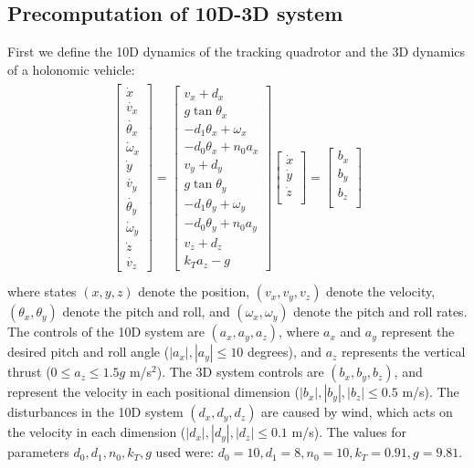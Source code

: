 \subsection{Precomputation of 10D-3D system}
First we define the 10D dynamics of the tracking quadrotor and the 3D dynamics of a holonomic vehicle:
\begin{equation}
\label{eq:Quad10D_dyn}
\begin{aligned}
\begin{array}{c}
\left[
\begin{array}{c}
\dot{x}\\
\dot{v_x}\\
\dot{\theta_x}\\
\dot\omega_x\\
\dot{y}\\
\dot{v_y}\\
\dot{\theta_y}\\
\dot\omega_y\\
\dot{z}\\
\dot{v_z}
\end{array}
\right]
=
\left[
\begin{array}{c}
v_x + d_x\\
g \tan \theta_x\\
-d_1 \theta_x + \omega_x\\
-d_0 \theta_x + n_0 a_x\\
v_y + d_y\\
g \tan \theta_y\\
-d_1 \theta_y + \omega_y\\
-d_0 \theta_y + n_0 a_y\\
v_z + d_z\\
k_T a_z - g
\end{array}
\right]
\left[
\begin{array}{c}
\dot{x}\\
\dot{y}\\
\dot{z}\\
\end{array}
\right] 
=
\left[
\begin{array}{c}
b_x\\
b_y\\
b_z \\
\end{array}
\right]
\end{array}\\
\end{aligned}
\end{equation}
where states $(x, y, z)$ denote the position, $(v_x, v_y, v_z)$ denote the velocity, $(\theta_x, \theta_y)$ denote the pitch and roll, and $(\omega_x, \omega_y)$ denote the pitch and roll rates. The controls of the 10D system are $(a_x, a_y, a_z)$, where $a_x$ and $a_y$ represent the desired pitch and roll angle ($|a_x|,|a_y|\leq10$ degrees), and $a_z$ represents the vertical thrust ($0\leq a_z\leq 1.5g$ m/s$^{2}$). The 3D system controls are $(b_x, b_y, b_z)$, and represent the velocity in each positional dimension ($|b_x|,|b_y|,|b_z|\leq0.5$ m/s). The disturbances in the 10D system $(d_x, d_y, d_z)$ are caused by wind, which acts on the velocity in each dimension ($|d_x|,|d_y|,|d_z|\leq0.1$ m/s). The values for parameters $d_0,d_1,n_0,k_T,g$ used were: $d_0=10,d_1=8,n_0=10,k_T=0.91,g=9.81$.


